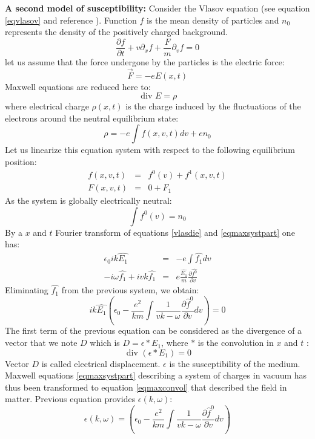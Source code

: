 \documentclass[12pt]{book}
\begin{document}
\begin{exmp}{\bf A second model of susceptibility:}
Consider the Vlasov equation (see equation \ref{eqvlasov} and reference
\cite{ph:physt:Diu89}). Function $f$ is the mean density of particles and
$n_0$ represents the density of the positively charged background.
\begin{equation}\label{vlasdie}
\frac{\partial f}{\partial t}+{v}\partial_x f+\frac{F}{m}\partial_v f= 0
\end{equation}
let us assume that the force undergone by the particles is the electric force:
\begin{equation}
\vec{F}=-eE(x,t)
\end{equation}
Maxwell equations are reduced here to:
\begin{equation}\label{eqmaxsystpart}
\mbox{ div } E=\rho
\end{equation}
where electrical charge $\rho(x,t)$ is the charge induced by the fluctuations
of the electrons around the neutral equilibrium state:
\begin{equation}
\rho=-e\int f(x,v,t)dv+en_0
\end{equation}
Let us linearize this equation system with respect to the following
equilibrium position:
\begin{eqnarray}
f(x,v,t)&=&f^0(v)+f^1(x,v,t)\nonumber\\
F(x,v,t)&=&0+F_1
\end{eqnarray}
As the system is globally electrically neutral:
\begin{equation}
\int f^0(v) = n_0
\end{equation}
By a $x$ and $t$ Fourier transform of equations \ref{vlasdie} and
\ref{eqmaxsystpart} one has:
\begin{eqnarray}
\epsilon_0 ik \hat{E_1}&=&-e\int \hat{f_1} dv\\
-i\omega \hat{f_1}+ivk\hat{f_1}&=&e\frac{\hat{E_1}}{m} \frac{\partial
\hat{f^0}}{\partial v} 
\end{eqnarray}
Eliminating $\hat{f_1}$ from the previous system, we obtain:
\begin{equation}
ik\hat{E_1}(\epsilon_0 - \frac{e^2}{km}\int
\frac{1}{vk-\omega}\frac{\partial \hat f^0}{\partial v}dv)=0
\end{equation}
The first term of the previous equation can be considered as the divergence of
a vector that we note $D$ which is $D=\epsilon*E_1$, where $*$ is the
convolution in $x$ and $t$ :
\begin{equation}\label{eqmaxconvol}
\mbox{ div }(\epsilon *E_1)=0
\end{equation}
Vector $D$ is called electrical displacement. $\epsilon$ is the susceptibility
of the medium. Maxwell equations \ref{eqmaxsystpart} describing a system of
charges in vacuum has thus been transformed to equation \ref{eqmaxconvol} that
described the field in matter. Previous equation provides $\epsilon
(k,\omega)$: 
\begin{equation}
\epsilon (k,\omega)=(\epsilon_0 - \frac{e^2}{km}\int
\frac{1}{vk-\omega}\frac{\partial \hat{f}^0}{\partial v}dv)
\end{equation}
\end{exmp}
\end{document}
